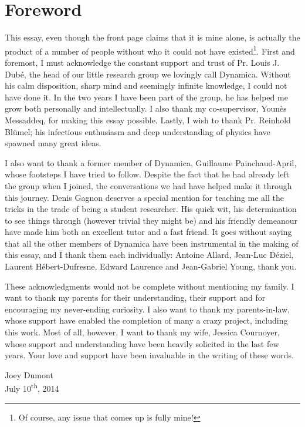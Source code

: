 \chapter*{Foreword}
\renewcommand*{\thefootnote}{\fnsymbol{footnote}}
This essay, even though the front page claims that it is mine alone, 
is actually the product of a number of people without who it
could not have existed\footnote{Of course, any issue that comes up
is fully mine!}. First and foremost, I must acknowledge
the constant support and trust of Pr. Louis J. Dubé, the head
of our little research group we lovingly call Dynamica. Without his calm
disposition, sharp mind and seemingly infinite knowledge, I could not have done it.
In the two years I have been part of the group, he has helped
me grow both personally and intellectually. I also thank my 
co-supervisor, Younès Messaddeq, for making this essay possible.
Lastly, I wish to thank Pr. Reinhold Blümel; his infectious 
enthusiasm and deep understanding of physics have spawned 
many great ideas. 


I also want to thank a former member of Dynamica, 
Guillaume Painchaud-April, whose footsteps I have
tried to follow. Despite the fact that he had already left
the group when I joined, the conversations we had have helped
make it through this journey. Denis Gagnon deserves a special mention
for teaching me all the tricks in the trade of being a student
researcher. His quick wit, his determination to see things through
(however trivial they might be) 
and  his friendly demeanour have made him both an excellent tutor 
and a fast friend. It goes without saying that all the other
members of Dynamica have been instrumental in the making 
of this essay, and I thank them each individually: Antoine 
Allard, Jean-Luc Déziel, Laurent Hébert-Dufresne, Edward
Laurence and Jean-Gabriel Young, thank you. 

These acknowledgments would not be complete without
mentioning my family. I want to thank my parents 
for their understanding, their support and for 
encouraging my never-ending curiosity. I also 
want to thank my parents-in-law, whose support 
have enabled the completion of many a crazy project, 
including this work. Most of all, however, I want to 
thank my wife, Jessica Cournoyer, whose support and 
understanding have been heavily solicited in the last few years. 
Your love and support have been invaluable in the writing of these words. 

\begin{flushright}
Joey Dumont\\
July 10\textsuperscript{th}, 2014
\end{flushright}